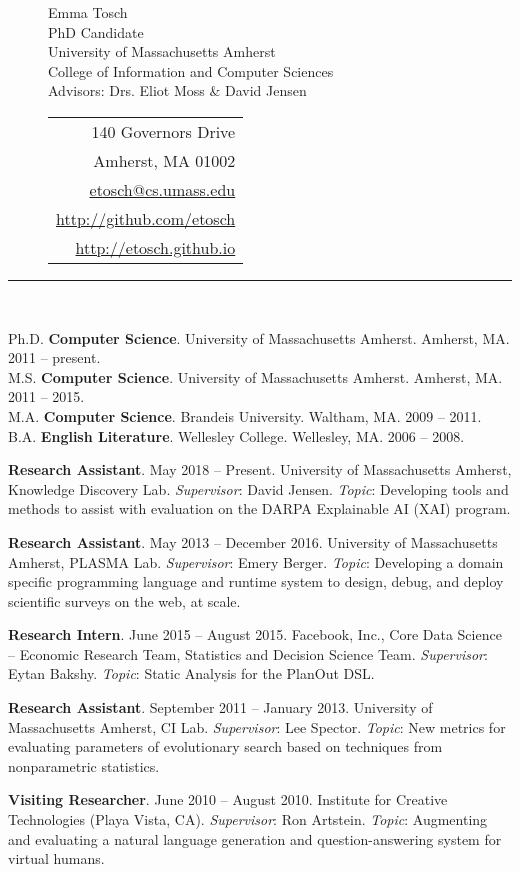 \documentclass[10pt]{article}
\newcommand{\cvsec}[2]{
    \begin{tcolorbox}[width=\textwidth, breakable, title={#1}]
        #2
    \end{tcolorbox}
    \vspace{10pt}
}
\newcommand{\research}[6]{
  \parbox{\textwidth}{
    \textbf{#1}. #2 -- #3. #4. \newline
    \textit{Supervisor}: #5. \textit{Topic}: #6.
    \vspace{5pt}
  }
}
\newcommand{\umass}{University of Massachusetts Amherst}
\begin{document}
\renewcommand{\arraystretch}{1.2}

\begin{figure*}
\begin{subfigure}{0.75\textwidth}
{\Large \noindent Emma Tosch}		\\
PhD Candidate\\
\umass{}\\
College of Information and Computer Sciences\\
Advisors: Drs. Eliot Moss \& David Jensen
\end{subfigure}
\begin{subfigure}{0.25\textwidth}
\begin{tabular}{r}
140 Governors Drive \\
Amherst, MA 01002\\
\url{etosch@cs.umass.edu}\\
\url{http://github.com/etosch} \\
\url{http://etosch.github.io}\\
\end{tabular}
\end{subfigure}
\rule{\linewidth}{0.3mm}\\
\end{figure*}

\cvsec{Education}{Ph.D. {\bf Computer Science}. \umass{}. Amherst, MA. 2011 -- present.  \\
        M.S. {\bf Computer Science}. \umass{}. Amherst, MA. 2011 -- 2015.\\
        M.A. {\bf Computer Science}. Brandeis University. Waltham, MA. 2009 -- 2011. \\
	B.A. {\bf English Literature}. Wellesley College. Wellesley, MA. 2006 -- 2008.
}

\cvsec{Research Experience}{
  \research{Research Assistant}{May 2018}{Present}{\umass{}, Knowledge Discovery Lab}{David Jensen}{Developing tools and methods to assist with evaluation on the DARPA Explainable  AI (XAI) program}
  \research{Research Assistant}{May 2013}{December 2016}{\umass{}, PLASMA Lab}{Emery Berger}{Developing a domain specific programming language and runtime system to design, debug, and deploy scientific surveys on the web, at scale}
  \research{Research Intern}{June 2015}{August 2015}{Facebook, Inc., Core Data Science -- Economic Research Team, Statistics and Decision Science Team}{Eytan Bakshy}{Static Analysis for the PlanOut DSL}
  \research{Research Assistant}{September 2011}{January 2013}{\umass{}, CI Lab}{Lee Spector}{New metrics for evaluating parameters of evolutionary search based on techniques from nonparametric statistics}
  \research{Visiting Researcher}{June 2010}{August 2010}{Institute for Creative Technologies (Playa Vista, CA)}{Ron Artstein}{Augmenting and evaluating a natural language generation and question-answering system for virtual humans}
}
\end{document}
